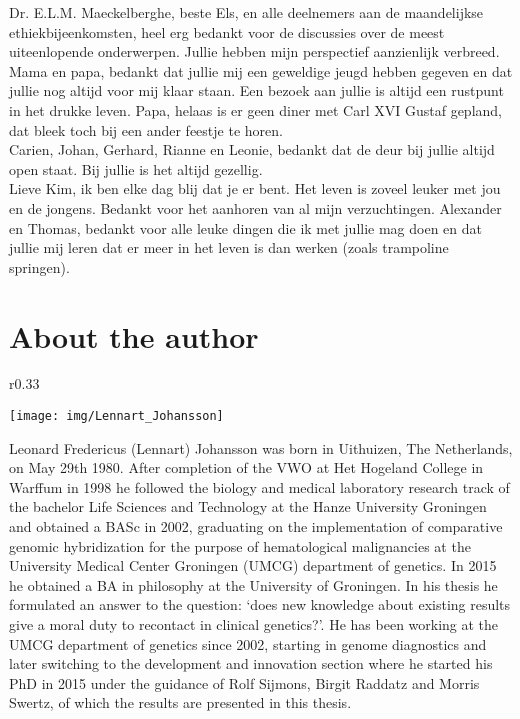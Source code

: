 \begin{appendices}
	\noindent Dr. E.L.M. Maeckelberghe, beste Els, en alle deelnemers aan de maandelijkse ethiekbijeenkomsten, heel erg bedankt voor de discussies over de meest uiteenlopende onderwerpen.  Jullie hebben mijn perspectief aanzienlijk verbreed.\\
	
	\noindent Mama en papa, bedankt dat jullie mij een geweldige jeugd hebben gegeven en dat jullie nog altijd voor mij klaar staan. Een bezoek aan jullie is altijd een rustpunt in het drukke leven. Papa, helaas is er geen diner met Carl XVI Gustaf gepland, dat bleek toch bij een ander feestje te horen.\\
	
	\noindent Carien, Johan, Gerhard, Rianne en Leonie, bedankt dat de deur bij jullie altijd open staat. Bij jullie is het altijd gezellig.\\
	
	\noindent Lieve Kim, ik ben elke dag blij dat je er bent. Het leven is zoveel leuker met jou en de jongens. Bedankt voor het aanhoren van al mijn verzuchtingen. Alexander en Thomas, bedankt voor alle leuke dingen die ik met jullie mag doen en dat jullie mij leren dat er meer in het leven is dan werken (zoals trampoline springen). 
	
	\chapter{About the author}
	
	\begin{wrapfigure}{r}{0.33\textwidth}
		\begin{center}
			\texttt{[image: img/Lennart\_Johansson]}
		\end{center}
	\end{wrapfigure}
	Leonard Fredericus (Lennart) Johansson was born in Uithuizen, The Netherlands, on May 29th 1980. 
	After completion of the VWO at Het Hogeland College in Warffum in 1998 he followed the biology and medical laboratory research track of the bachelor Life Sciences and Technology at the Hanze University Groningen and obtained a BASc in 2002, graduating on the implementation of comparative genomic hybridization for the purpose of hematological malignancies at the University Medical Center Groningen (UMCG) department of genetics. 
	In 2015 he obtained a BA in philosophy at the University of Groningen. 
	In his thesis he formulated an answer to the question: ‘does new knowledge about existing results give a moral duty to recontact in clinical genetics?’. 
	He has been working at the UMCG department of genetics since 2002, starting in genome diagnostics and later switching to the development and innovation section where he started his PhD in 2015 under the guidance of Rolf Sijmons, Birgit Raddatz and Morris Swertz, of which the results are presented in this thesis.
	

\end{appendices}
